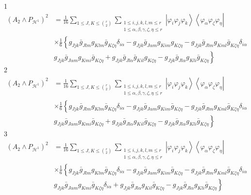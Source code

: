 \documentclass[aps,preprint]{revtex4}%
\begin{document}
1%
\begin{align}
\left(  A_{2}\wedge P_{\mathcal{H}^{1}}\right)  ^{2} &  =\frac{1}{16}%
\sum_{1\leq J,K\leq\binom{r}{2}}\sum_{\substack{1\leq i,j,k,l,m\leq
r\\1\leq\alpha,\beta,\gamma,\zeta,\eta\leq r}}\left\vert \varphi_{i}%
\varphi_{j}\varphi_{k}\right\rangle \left\langle \varphi_{\alpha}%
\varphi_{\zeta}\varphi_{\eta}\right\vert \\
&  \times\frac{1}{6}\left\{  g_{Jjk}\bar{g}_{Jlm}g_{Klm}\bar{g}_{K\zeta\eta
}\delta_{i\alpha}-g_{Jjk}\bar{g}_{J\alpha m}g_{Kim}g_{K\zeta\eta}-g_{Jjk}%
\bar{g}_{Jlm}g_{Kml}\bar{g}_{K\zeta\eta}\delta_{i\alpha}\right.  \\
&  \left.  g_{Jjk}\bar{g}_{J\alpha m}g_{Kmi}\bar{g}_{K\zeta\eta}+g_{Jjk}%
\bar{g}_{Jl\alpha}\bar{g}_{Kil}g_{K\zeta\eta}-g_{Jjk}\bar{g}_{Jl\alpha}%
g_{Kli}\bar{g}_{K\zeta\eta}\right\}
\end{align}
2%
\begin{align}
\left(  A_{2}\wedge P_{\mathcal{H}^{1}}\right)  ^{2} &  =\frac{1}{16}%
\sum_{1\leq J,K\leq\binom{r}{2}}\sum_{\substack{1\leq i,j,k,l,m\leq
r\\1\leq\alpha,\beta,\gamma,\zeta,\eta\leq r}}\left\vert \varphi_{i}%
\varphi_{j}\varphi_{k}\right\rangle \left\langle \varphi_{\alpha}%
\varphi_{\zeta}\varphi_{\eta}\right\vert \\
&  \times\frac{1}{6}\left\{  g_{Jjk}\bar{g}_{Jlm}g_{Klm}\bar{g}_{K\zeta\eta
}\delta_{i\alpha}-g_{Jjk}\bar{g}_{J\alpha m}g_{Kim}\bar{g}_{K\zeta\eta
}-g_{Jjk}\bar{g}_{Jlm}g_{Kml}\bar{g}_{K\zeta\eta}\delta_{i\alpha}\right.  \\
&  \left.  g_{Jjk}\bar{g}_{J\alpha m}g_{Kmi}\bar{g}_{K\zeta\eta}+g_{Jjk}%
\bar{g}_{Jl\alpha}g_{Kil}\bar{g}_{K\zeta\eta}-g_{Jjk}\bar{g}_{Jl\alpha}%
g_{Kli}\bar{g}_{K\zeta\eta}\right\}
\end{align}
3%
\begin{align}
\left(  A_{2}\wedge P_{\mathcal{H}^{1}}\right)  ^{2} &  =\frac{1}{16}%
\sum_{1\leq J,K\leq\binom{r}{2}}\sum_{\substack{1\leq i,j,k,l,m\leq
r\\1\leq\alpha,\beta,\gamma,\zeta,\eta\leq r}}\left\vert \varphi_{i}%
\varphi_{j}\varphi_{k}\right\rangle \left\langle \varphi_{\alpha}%
\varphi_{\zeta}\varphi_{\eta}\right\vert \\
&  \times\frac{1}{6}\left\{  g_{Jjk}\bar{g}_{Jlm}g_{Klm}\bar{g}_{K\zeta\eta
}\delta_{i\alpha}-g_{Jjk}\bar{g}_{J\alpha m}g_{Kim}\bar{g}_{K\zeta\eta
}-g_{Jjk}\bar{g}_{Jlm}g_{Kml}\bar{g}_{K\zeta\eta}\delta_{i\alpha}\right.  \\
&  g_{Jjk}\bar{g}_{J\alpha m}g_{Kmi}\bar{g}_{K\zeta\eta}\left.  \delta
_{i\alpha}+g_{Jjk}\bar{g}_{Jl\alpha}g_{Kil}\bar{g}_{K\zeta\eta}-g_{Jjk}\bar
{g}_{Jl\alpha}g_{Kli}\bar{g}_{K\zeta\eta}\right\}
\end{align}
\end{document}
